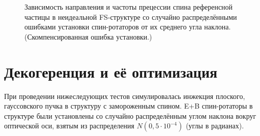 \begin{figure}[!h]
	\centering\hfill
	\hfill
	\hfill
	\caption{Зависимость направления и частоты прецессии спина референсной частицы в неидеальной FS-структуре со случайно распределёнными ошибками установки спин-ротаторов от их среднего угла наклона. (Скомпенсированная ошибка установки.)\label{fig:Linearity_test_compensated}}
\end{figure}

\section{Декогеренция и её оптимизация}\label{sec:decoherence_simulations}
При проведении нижеследующих тестов симулировалась инжекция
плоского, гауссовского пучка в структуру с замороженным
спином. E+B спин-ротаторы в структуре были установлены со случайно распределённым углом наклона вокруг оптической оси, взятым из распределения $N(0, 5\cdot10^{-4})$ (углы в радианах).

